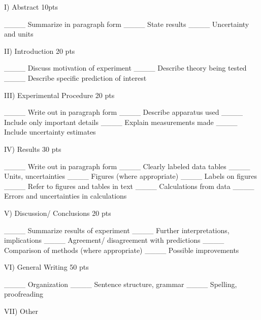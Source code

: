 \documentclass[
    8pt,
    DIV=64,
    BCOR=0mm,
    paper=11in:8.5in,
    pagesize,
]{scrartcl}
\begin{document}


         
I)  Abstract            10pts

        ____   Summarize in paragraph form
        ____   State results
        ____   Uncertainty and units

II) Introduction            20 pts

        ____   Discuss motivation of experiment
        ____   Describe theory being tested
        ____   Describe specific prediction of interest

III) Experimental Procedure         20 pts      

        ____   Write out in paragraph form
        ____   Describe apparatus used
        ____   Include only important details
        ____   Explain measurements made
        ____   Include uncertainty estimates

IV) Results             30 pts

        ____   Write out in paragraph form
        ____   Clearly labeled data tables
        ____   Units, uncertainties
        ____   Figures (where appropriate)
        ____   Labels on figures
        ____   Refer to figures and tables in text
        ____   Calculations from data
        ____   Errors and uncertainties in calculations

V) Discussion/ Conclusions          20 pts

        ____   Summarize results of experiment
        ____   Further interpretations, implications
        ____   Agreement/ disagreement with predictions
        ____   Comparison of methods (where appropriate)
        ____   Possible improvements

VI) General Writing         50 pts

        ____   Organization
        ____   Sentence structure, grammar
        ____   Spelling, proofreading

VII) Other
\\
\vfill
                  
\end{document}
